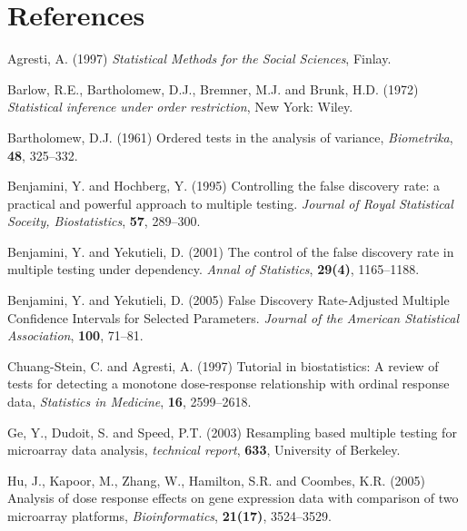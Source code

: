 \clearpage
\newpage


\section*{References}


\begin{list}{}{\setlength{\leftmargin}{.3in}\setlength{\itemindent}{-.2in}}

\item Agresti, A. (1997) \textit{Statistical Methods for the
Social Sciences}, Finlay.%

\item Barlow, R.E., Bartholomew, D.J.,
Bremner, M.J. and Brunk, H.D. (1972) \textit{Statistical inference
under order restriction}, New York: Wiley.%

\item Bartholomew, D.J. (1961) Ordered
tests in the analysis of variance, \textit{Biometrika}, \textbf{48},
325--332.%

\item Benjamini, Y. and Hochberg, Y.
(1995) Controlling the false discovery rate: a practical and
powerful approach to multiple testing. \textit{Journal of Royal
Statistical Soceity, Biostatistics}, \textbf{57}, 289--300.%


\item Benjamini, Y. and Yekutieli,
D. (2001) The control of the false discovery rate in multiple
testing under dependency. \textit{Annal of Statistics},
\textbf{29(4)}, 1165--1188.%


\item
Benjamini, Y. and Yekutieli, D. (2005) False Discovery
Rate-Adjusted Multiple Confidence Intervals for Selected Parameters.
{\em Journal of the American Statistical Association}, \textbf{100}, 71--81.%


\item Chuang-Stein, C. and Agresti, A. (1997) Tutorial in biostatistics:
A review of tests for detecting a monotone dose-response
relationship with ordinal response data, \textit{Statistics in
Medicine}, \textbf{16}, 2599--2618.%


\item Ge, Y., Dudoit, S. and Speed, P.T.
(2003) Resampling based multiple testing for microarray data
analysis,  \textit{technical report}, \textbf{633}, University of
Berkeley.%

\item Hu, J., Kapoor, M., Zhang, W.,
Hamilton, S.R. and Coombes, K.R. (2005) Analysis of dose response
effects on gene expression data with comparison of two microarray
platforms, \textit{Bioinformatics}, \textbf{21(17)}, 3524--3529.%


\end{list}
